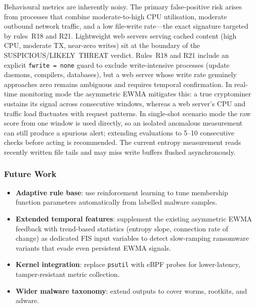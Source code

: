 \documentclass[conference]{IEEEtran}
\begin{document}
Behavioural metrics are inherently noisy.  The primary false-positive
risk arises from processes that combine moderate-to-high CPU utilisation,
moderate outbound network traffic, and a low file-write rate---the exact
signature targeted by rules~R18 and R21.  Lightweight web servers serving
cached content (high CPU, moderate TX, near-zero writes) sit at the
boundary of the SUSPICIOUS/LIKELY~THREAT verdict.  Rules~R18 and R21
include an explicit \texttt{fwrite\,=\,none} guard to exclude
write-intensive processes (update daemons, compilers, databases), but a
web server whose write rate genuinely approaches zero remains ambiguous
and requires temporal confirmation.  In real-time monitoring mode the
asymmetric EWMA mitigates this: a true cryptominer sustains its signal
across consecutive windows, whereas a web server's CPU and traffic load
fluctuates with request patterns.  In single-shot scenario mode the raw
score from one window is used directly, so an isolated anomalous
measurement can still produce a spurious alert; extending evaluations to
5--10 consecutive checks before acting is recommended.  The current
entropy measurement reads recently written file tails and may miss write
buffers flushed asynchronously.

\subsubsection*{Future Work}

\begin{itemize}[leftmargin=2em]
  \item \textbf{Adaptive rule base}: use reinforcement learning to
        tune membership function parameters automatically from labelled
        malware samples.
  \item \textbf{Extended temporal features}: supplement the existing
        asymmetric EWMA feedback with trend-based statistics (entropy
        slope, connection rate of change) as dedicated FIS input variables
        to detect slow-ramping ransomware variants that evade even
        persistent EWMA signals.
  \item \textbf{Kernel integration}: replace \texttt{psutil} with eBPF
        probes for lower-latency, tamper-resistant metric collection.
  \item \textbf{Wider malware taxonomy}: extend outputs to cover worms,
        rootkits, and adware.
\end{itemize}
\end{document}

